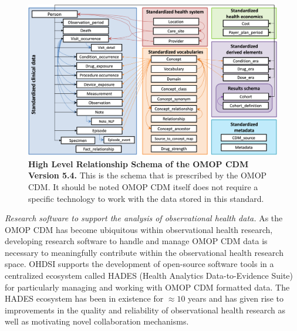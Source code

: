 \documentclass{juliacon}
\begin{document}
\begin{figure}[!ht]
\centering
\includegraphics[scale = 0.6]{omop_cdm.png}
\caption{\textbf{High Level Relationship Schema of the OMOP CDM Version 5.4.} This is the schema that is prescribed by the OMOP CDM. It should be noted OMOP CDM itself does not require a specific technology to work with the data stored in this standard.}
\label{fig:cdm}
\end{figure}

\textit{Research software to support the analysis of observational health data.} As the OMOP CDM has become ubiquitous within observational health research, developing research software to handle and manage OMOP CDM data is necessary to meaningfully contribute within the observational health research space.
OHDSI supports the development of open-source software tools in a centralized ecosystem called HADES (Health Analytics Data-to-Evidence Suite) for particularly managing and working with OMOP CDM formatted data.
The HADES ecosystem has been in existence for $\approx 10$ years and has given rise to improvements in the quality and reliability of observational health research as well as motivating novel collaboration mechanisms.
\end{document}
